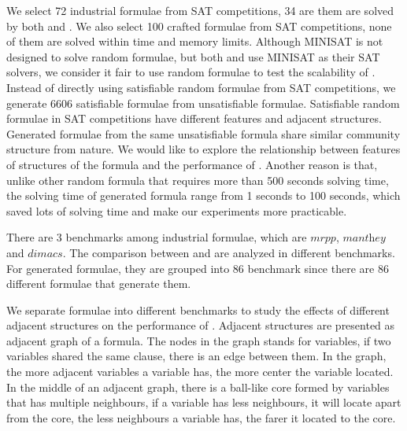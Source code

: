 We select 72 industrial formulae from SAT competitions, 34 are them are solved by both \tool and \minibones. We also select 100 crafted formulae from SAT competitions, none of them are solved within time and memory limits. Although MINISAT is not designed to solve random formulae, but both \tool and \minibones use MINISAT as their SAT solvers, we consider it fair to use random formulae to test the scalability of \tool. Instead of directly using satisfiable random formulae from SAT competitions, we generate 6606 satisfiable formulae from unsatisfiable formulae. Satisfiable random formulae in SAT competitions have different features and adjacent structures. Generated formulae from the same unsatisfiable formula share similar community structure from nature. We would like to explore the relationship between features of structures of the formula and the performance of \tool. Another reason is that, unlike other random formula that requires more than 500 seconds solving time, the solving time of generated formula range from 1 seconds to 100 seconds, which saved lots of solving time and make our experiments more practicable.

There are 3 benchmarks among industrial formulae, which are $\textit{mrpp}$, $\textit{manthey}$ and $\textit{dimacs}$. The comparison between \tool and \minibones are analyzed in different benchmarks.
For generated formulae, they are grouped into 86 benchmark since there are 86 different formulae that generate them.

We separate formulae into different benchmarks to study the effects of different adjacent structures on the performance of \tool. Adjacent structures are presented as adjacent graph of a formula. The nodes in the graph stands for variables, if two variables shared the same clause, there is an edge between them. In the graph, the more adjacent variables a variable has, the more center the variable located. In the middle of an adjacent graph, there is a ball-like core formed by variables that has multiple neighbours, if a variable has less neighbours, it will locate apart from the core, the less neighbours a variable has, the farer it located to the core.

